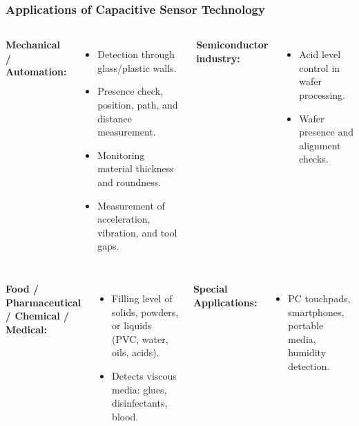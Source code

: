 \begin{frame}
	\frametitle{Applications of Capacitive Sensor Technology}
    \begin{columns}[T]
        \small
            \textbf{Mechanical / Automation:}
            \begin{itemize}
                \item Detection through glass/plastic walls.
                \item Presence check, position, path, and distance measurement.
                \item Monitoring material thickness and roundness.
                \item Measurement of acceleration, vibration, and tool gaps.
            \end{itemize}
            \textbf{Semiconductor industry:}
            \begin{itemize}
                \item Acid level control in wafer processing.
                \item Wafer presence and alignment checks.
            \end{itemize}
    \end{columns}
    \begin{columns}[T]
        \small
            \textbf{Food / Pharmaceutical / Chemical / Medical:}
            \begin{itemize}
                \item Filling level of solids, powders, or liquids (PVC, water, oils, acids).
                \item Detects viscous media: glues, disinfectants, blood.
            \end{itemize}
            \textbf{Special Applications:}
            \begin{itemize}
                \item PC touchpads, smartphones, portable media, humidity detection.
            \end{itemize}
    \end{columns}
\end{frame}

